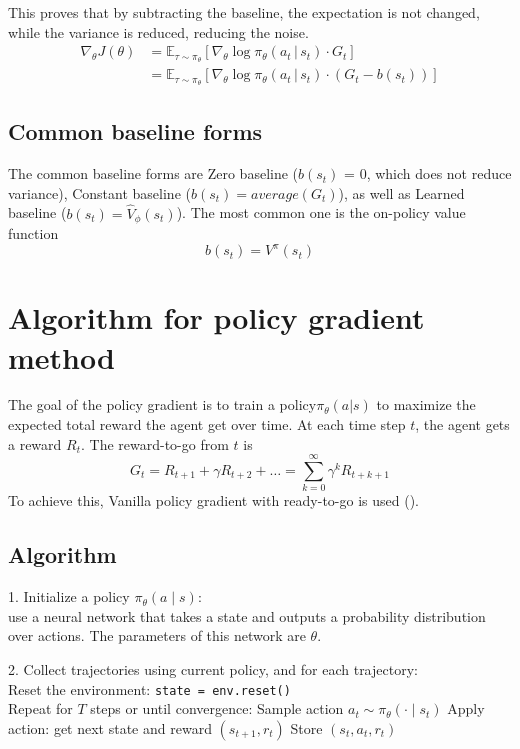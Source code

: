 \documentclass{article} %
\begin{document}
This proves that by subtracting the baseline, the expectation is not changed, while the variance is reduced, reducing the noise.
\begin{align*}
\nabla_{\theta} J(\theta) &= \mathbb{E}_{\tau \sim \pi_\theta} \left[ \nabla_{\theta} \log \pi_{\theta}(a_{t} \, | \, s_{t}) \cdot G_{t} \right] \\
&= \mathbb{E}_{\tau \sim \pi_\theta} \left[ \nabla_{\theta} \log \pi_{\theta}(a_{t} \, | \, s_{t}) \cdot (G_{t} - b(s_{t})) \right]
\end{align*}

\subsection{Common baseline forms}
The common baseline forms are Zero baseline (\(b(s_t)\) = 0, which does not reduce variance), Constant baseline (\(b(s_t) = average(G_t)\)), as well as Learned baseline ($b(s_t) = \hat{V}_\phi(s_t)$). The most common one is the on-policy value function
\[
b(s_t) = V^{\pi}(s_t)
\]

\section{Algorithm for policy gradient method}
The goal of the policy gradient is to train a policy\(\pi_\theta(a|s)\) to maximize the expected total reward the agent get over time. At each time step \(t\), the agent gets a reward \(R_t\). The reward-to-go from \(t\) is \[
G_t = R_{t+1} + \gamma R_{t+2} + \ldots = \sum_{k=0}^\infty \gamma^k R_{t+k+1}
\]
To achieve this, Vanilla policy gradient with ready-to-go is used (\cite{levine2023cs285}).

\subsection{Algorithm}
1. Initialize a policy \(\pi_\theta(a \mid s)\): \\
use a neural network that takes a state and outputs a probability distribution over actions. The parameters of this network are \(\theta\).

2. Collect trajectories using current policy, and for each trajectory:\\
Reset the environment: \texttt{state = env.reset()}\\
Repeat for \(T\) steps or until convergence:
Sample action \(a_t \sim \pi_\theta(\cdot \mid s_t)\)
Apply action: get next state and reward \((s_{t+1}, r_t)\)
Store \((s_t, a_t, r_t)\)
\end{document}
